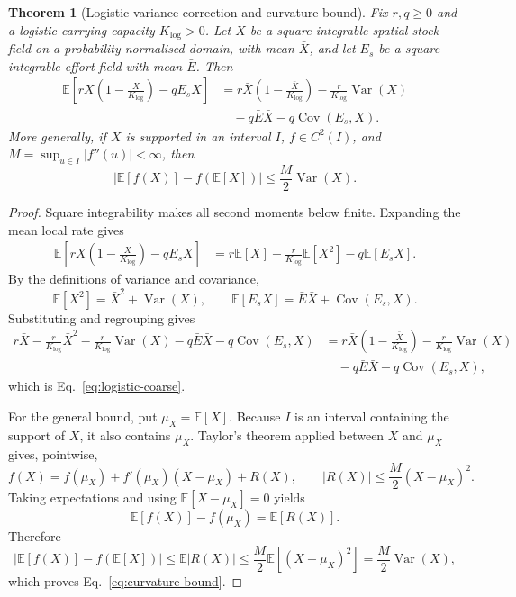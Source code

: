 \documentclass[11pt]{article}
\newtheorem{theorem}{Theorem}
\theoremstyle{definition}
\begin{document}
\begin{theorem}[Logistic variance correction and curvature bound]
\label{thm:coarse-graining}
Fix $r,q\ge0$ and a logistic carrying capacity $K_{\log}>0$. Let $X$ be a square-integrable spatial stock field on a probability-normalised domain, with mean $\bar X$, and let $E_s$ be a square-integrable effort field with mean $\bar E$. Then
\begin{align}
\mathbb E\!\left[rX\left(1-\frac{X}{K_{\log}}\right)-qE_sX\right]
&=r\bar X\left(1-\frac{\bar X}{K_{\log}}\right)
-\frac{r}{K_{\log}}\operatorname{Var}(X) \nonumber\\
&\quad-q\bar E\bar X-q\operatorname{Cov}(E_s,X).
\label{eq:logistic-coarse}
\end{align}
More generally, if $X$ is supported in an interval $I$, $f\in C^2(I)$, and $M=\sup_{u\in I}|f''(u)|<\infty$, then
\begin{equation}
\left|\mathbb E[f(X)]-f(\mathbb E[X])\right|
\le\frac{M}{2}\operatorname{Var}(X).
\label{eq:curvature-bound}
\end{equation}
\end{theorem}

\begin{proof}
Square integrability makes all second moments below finite. Expanding the mean local rate gives
\begin{align*}
\mathbb E\!\left[rX\left(1-\frac{X}{K_{\log}}\right)-qE_sX\right]
&=r\mathbb E[X]-\frac{r}{K_{\log}}\mathbb E[X^2]-q\mathbb E[E_sX].
\end{align*}
By the definitions of variance and covariance,
\[
\mathbb E[X^2]=\bar X^2+\operatorname{Var}(X),
\qquad
\mathbb E[E_sX]=\bar E\bar X+\operatorname{Cov}(E_s,X).
\]
Substituting and regrouping gives
\begin{align*}
r\bar X-\frac{r}{K_{\log}}\bar X^2
-\frac{r}{K_{\log}}\operatorname{Var}(X)
-q\bar E\bar X-q\operatorname{Cov}(E_s,X)
&=r\bar X\left(1-\frac{\bar X}{K_{\log}}\right)
-\frac{r}{K_{\log}}\operatorname{Var}(X)\\
&\quad-q\bar E\bar X-q\operatorname{Cov}(E_s,X),
\end{align*}
which is Eq.~\eqref{eq:logistic-coarse}.

For the general bound, put $\mu_X=\mathbb E[X]$. Because $I$ is an interval containing the support of $X$, it also contains $\mu_X$. Taylor's theorem applied between $X$ and $\mu_X$ gives, pointwise,
\[
f(X)=f(\mu_X)+f'(\mu_X)(X-\mu_X)+R(X),
\qquad
|R(X)|\le\frac M2(X-\mu_X)^2.
\]
Taking expectations and using $\mathbb E[X-\mu_X]=0$ yields
\[
\mathbb E[f(X)]-f(\mu_X)=\mathbb E[R(X)].
\]
Therefore
\[
|\mathbb E[f(X)]-f(\mathbb E[X])|
\le\mathbb E|R(X)|
\le\frac M2\mathbb E[(X-\mu_X)^2]
=\frac M2\operatorname{Var}(X),
\]
which proves Eq.~\eqref{eq:curvature-bound}.
\end{proof}
\end{document}
